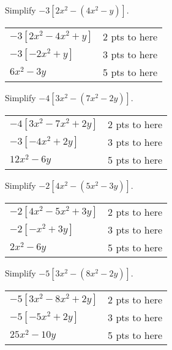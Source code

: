 {
	Simplify $-3[2x^2-(4x^2-y)]$.
}
{
	\begin{tabular}{lr}
	$-3[2x^2-4x^2+y]$ & 2 pts to here \\
	$-3[-2x^2+y]$ & 3 pts to here\\
	$6x^2-3y$ & 5 pts to here
	\end{tabular}
}

{
	Simplify $-4[3x^2-(7x^2-2y)]$.
}
{
	\begin{tabular}{lr}
	$-4[3x^2-7x^2+2y]$ & 2 pts to here \\
	$-3[-4x^2+2y]$ & 3 pts to here\\
	$12x^2-6y$ & 5 pts to here
	\end{tabular}
}

{
	Simplify $-2[4x^2-(5x^2-3y)]$.
}
{
	\begin{tabular}{lr}
	$-2[4x^2-5x^2+3y]$ & 2 pts to here \\
	$-2[-x^2+3y]$ & 3 pts to here\\
	$2x^2-6y$ & 5 pts to here
	\end{tabular}
}

{
	Simplify $-5[3x^2-(8x^2-2y)]$.
}
{
	\begin{tabular}{lr}
	$-5[3x^2-8x^2+2y]$ & 2 pts to here \\
	$-5[-5x^2+2y]$ & 3 pts to here\\
	$25x^2-10y$ & 5 pts to here
	\end{tabular}
}